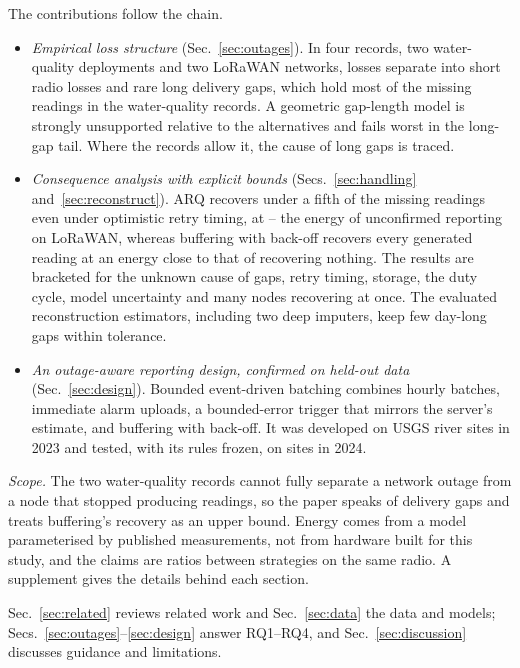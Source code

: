 The contributions follow the chain.
\begin{itemize}
\item \emph{Empirical loss structure} (Sec.~\ref{sec:outages}). In four records, two water-quality deployments and two LoRaWAN networks, losses separate into short radio losses and rare long delivery gaps, which hold most of the missing readings in the water-quality records. A geometric gap-length model is strongly unsupported relative to the alternatives and fails worst in the long-gap tail. Where the records allow it, the cause of long gaps is traced.
\item \emph{Consequence analysis with explicit bounds} (Secs.~\ref{sec:handling} and~\ref{sec:reconstruct}). ARQ recovers under a fifth of the missing readings even under optimistic retry timing, at \arqRatioMin--\arqRatioMax{} the energy of unconfirmed reporting on LoRaWAN, whereas buffering with back-off recovers every generated reading at an energy close to that of recovering nothing. The results are bracketed for the unknown cause of gaps, retry timing, storage, the duty cycle, model uncertainty and many nodes recovering at once. The evaluated reconstruction estimators, including two deep imputers, keep few day-long gaps within tolerance.
\item \emph{An outage-aware reporting design, confirmed on held-out data} (Sec.~\ref{sec:design}). Bounded event-driven batching combines hourly batches, immediate alarm uploads, a bounded-error trigger that mirrors the server's estimate, and buffering with back-off. It was developed on \designSites{} USGS river sites in 2023 and tested, with its rules frozen, on \confSites{} sites in 2024.
\end{itemize}

\emph{Scope.} The two water-quality records cannot fully separate a network outage from a node that stopped producing readings, so the paper speaks of delivery gaps and treats buffering's recovery as an upper bound. Energy comes from a model parameterised by published measurements, not from hardware built for this study, and the claims are ratios between strategies on the same radio. A supplement gives the details behind each section.

Sec.~\ref{sec:related} reviews related work and Sec.~\ref{sec:data} the data and models; Secs.~\ref{sec:outages}--\ref{sec:design} answer RQ1--RQ4, and Sec.~\ref{sec:discussion} discusses guidance and limitations.
